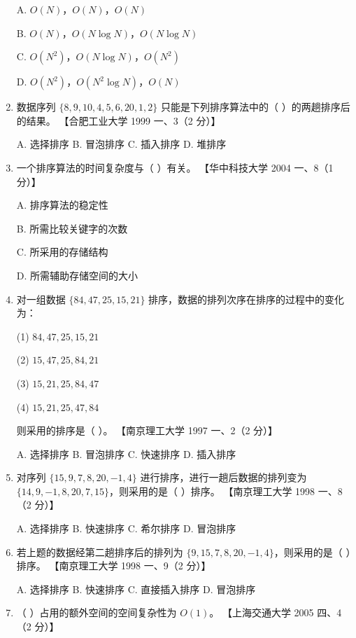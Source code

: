\documentclass[lang=cn,newtx,10pt,scheme=chinese]{elegantbook}
\begin{document}
\begin{enumerate}
    A. $O(N)$，$O(N)$，$O(N)$  

    B. $O(N)$，$O(N \log N)$，$O(N \log N)$  

    C. $O(N^2)$，$O(N \log N)$，$O(N^2)$

    D. $O(N^2)$，$O(N^2 \log N)$，$O(N)$  

    \item 数据序列 $\{8, 9, 10, 4, 5, 6, 20, 1, 2\}$ 只能是下列排序算法中的（ ）的两趟排序后的结果。  
    【合肥工业大学 1999 一、3（2 分）】  

    A. 选择排序 \quad B. 冒泡排序 \quad C. 插入排序 \quad D. 堆排序  

    \item 一个排序算法的时间复杂度与（ ）有关。  
    【华中科技大学 2004 一、8（1 分）】  

    A. 排序算法的稳定性  

    B. 所需比较关键字的次数  

    C. 所采用的存储结构  
    
    D. 所需辅助存储空间的大小  

    \item 对一组数据 $\{84, 47, 25, 15, 21\}$ 排序，数据的排列次序在排序的过程中的变化为：  
    
    (1) $84, 47, 25, 15, 21$  
   
    (2) $15, 47, 25, 84, 21$  
   
    (3) $15, 21, 25, 84, 47$  
    
    (4) $15, 21, 25, 47, 84$  

    则采用的排序是（ ）。  
    【南京理工大学 1997 一、2（2 分）】  

    A. 选择排序 \quad B. 冒泡排序 \quad C. 快速排序 \quad D. 插入排序  

    \item 对序列 $\{15, 9, 7, 8, 20, -1, 4\}$ 进行排序，进行一趟后数据的排列变为 $\{14, 9, -1, 8, 20, 7, 15\}$，则采用的是（ ）排序。  
    【南京理工大学 1998 一、8（2 分）】  

    A. 选择排序 \quad B. 快速排序 \quad C. 希尔排序 \quad D. 冒泡排序  

    \item 若上题的数据经第二趟排序后的排列为 $\{9, 15, 7, 8, 20, -1, 4\}$，则采用的是（ ）排序。  
    【南京理工大学 1998 一、9（2 分）】 

    A. 选择排序 \quad B. 快速排序 \quad C. 直接插入排序 \quad D. 冒泡排序  

    \item （ ）占用的额外空间的空间复杂性为 $O(1)$。  
    【上海交通大学 2005 四、4（2 分）】  


\end{enumerate}
\end{document}
